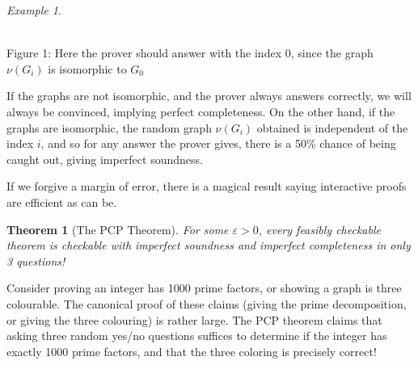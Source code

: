 \documentclass{article}
\theoremstyle{plain}
\newtheorem{theorem}{Theorem}
\theoremstyle{remark}
\newtheorem*{example}{Example}
\theoremstyle{definition}
\begin{document}
\begin{multicols}{2}
\begin{example}
\begin{center}
\\
{\small Figure 1: Here the prover should answer with the index 0, since the graph $\nu(G_i)$ is isomorphic to $G_0$}
\end{center}

If the graphs are not isomorphic, and the prover always answers correctly, we will always be convinced, implying perfect completeness. On the other hand, if the graphs are isomorphic, the random graph $\nu(G_i)$ obtained is independent of the index $i$, and so for any answer the prover gives, there is a 50\% chance of being caught out, giving imperfect soundness.
\end{example}

If we forgive a margin of error, there is a magical result saying interactive proofs are efficient as can be.

\begin{theorem}[The PCP Theorem]
    For some $\varepsilon > 0$, every feasibly checkable theorem is checkable with imperfect soundness and imperfect completeness in only 3 questions!
\end{theorem}

Consider proving an integer has 1000 prime factors, or showing a graph is three colourable. The canonical proof of these claims (giving the prime decomposition, or giving the three colouring) is rather large. The PCP theorem claims that asking three random yes/no questions suffices to determine if the integer has exactly 1000 prime factors, and that the three coloring is precisely correct!

\begin{center}
\end{center}
\end{multicols}
\end{document}
